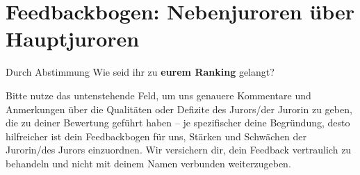 \section*{Feedbackbogen: Nebenjuroren über Hauptjuroren}


\bigskip

{Durch Abstimmung}{
  Wie seid ihr zu \textbf{eurem Ranking} gelangt?
}
\medskip

\medskip

\medskip

\medskip

\medskip

\hrulefill

Bitte nutze das untenstehende Feld, um uns genauere Kommentare und Anmerkungen
über die Qualitäten oder Defizite des Jurors/der Jurorin zu geben, die zu
deiner Bewertung geführt haben -- je spezifischer deine Begründung, desto
hilfreicher ist dein Feedbackbogen für uns, Stärken und Schwächen der
Jurorin/des Jurors einzuordnen. Wir versichern dir, dein Feedback vertraulich zu
behandeln und nicht mit deinem Namen verbunden weiterzugeben.

\medskip

\strengthsandweaknesses{9cm}

\newpage

